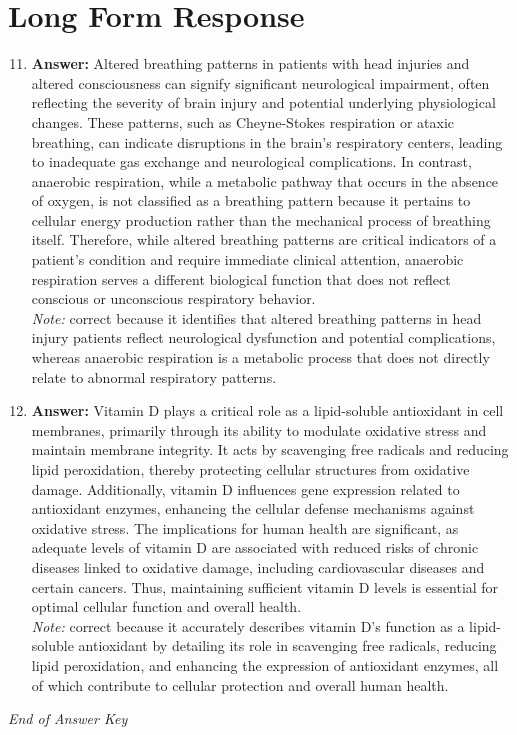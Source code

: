 \documentclass[12pt]{article}
\begin{document}
\section*{Long Form Response}
\begin{enumerate}[label=\arabic*.]
\setcounter{enumi}{10}
\item \textbf{Answer:} Altered breathing patterns in patients with head injuries and altered consciousness can signify significant neurological impairment, often reflecting the severity of brain injury and potential underlying physiological changes. These patterns, such as Cheyne-Stokes respiration or ataxic breathing, can indicate disruptions in the brain's respiratory centers, leading to inadequate gas exchange and neurological complications. In contrast, anaerobic respiration, while a metabolic pathway that occurs in the absence of oxygen, is not classified as a breathing pattern because it pertains to cellular energy production rather than the mechanical process of breathing itself. Therefore, while altered breathing patterns are critical indicators of a patient's condition and require immediate clinical attention, anaerobic respiration serves a different biological function that does not reflect conscious or unconscious respiratory behavior.
\\ \textit{Note:} correct because it identifies that altered breathing patterns in head injury patients reflect neurological dysfunction and potential complications, whereas anaerobic respiration is a metabolic process that does not directly relate to abnormal respiratory patterns.
\item \textbf{Answer:} Vitamin D plays a critical role as a lipid-soluble antioxidant in cell membranes, primarily through its ability to modulate oxidative stress and maintain membrane integrity. It acts by scavenging free radicals and reducing lipid peroxidation, thereby protecting cellular structures from oxidative damage. Additionally, vitamin D influences gene expression related to antioxidant enzymes, enhancing the cellular defense mechanisms against oxidative stress. The implications for human health are significant, as adequate levels of vitamin D are associated with reduced risks of chronic diseases linked to oxidative damage, including cardiovascular diseases and certain cancers. Thus, maintaining sufficient vitamin D levels is essential for optimal cellular function and overall health.
\\ \textit{Note:} correct because it accurately describes vitamin D's function as a lipid-soluble antioxidant by detailing its role in scavenging free radicals, reducing lipid peroxidation, and enhancing the expression of antioxidant enzymes, all of which contribute to cellular protection and overall human health.
\end{enumerate}

\vfill
\noindent\textit{End of Answer Key}
\end{document}
